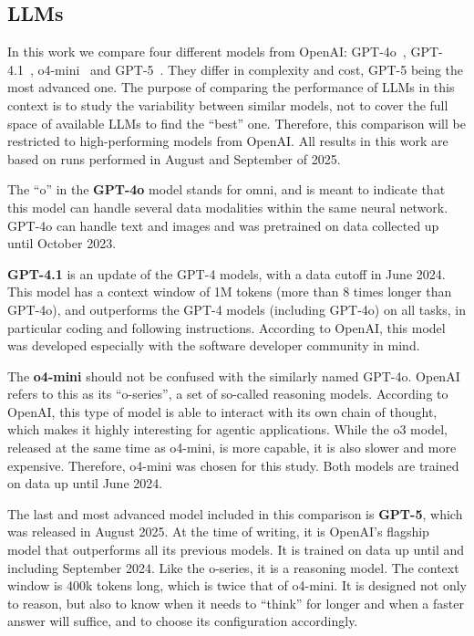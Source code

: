 \documentclass[submission, Phys]{SciPost}
\begin{document}
\subsection{LLMs}
\label{sec:llm_models}
In this work we compare four different models from OpenAI: GPT-4o~\cite{openaihelloGPT-4o,openai2024gpt4ocard}, GPT-4.1~\cite{openaiintroducingGPT-41}, o4-mini~\cite{openaiintroducingopenaio3ando4-mini,openaio3ando4-minicard} and GPT-5~\cite{openaiintroducinggpt-5,openaigpt-5systemcard}. They differ in complexity and cost, GPT-5 being the most advanced one. The purpose of comparing the performance of LLMs in this context is to study the variability between similar models, not to cover the full space of available LLMs to find the ``best'' one. Therefore, this comparison will be restricted to high-performing models from OpenAI. All results in this work are based on runs performed in August and September of 2025.

The ``o'' in the \textbf{GPT-4o} model stands for omni, and is meant to indicate that this model can handle several data modalities within the same neural network. GPT-4o can handle text and images and was pretrained on data collected up until October 2023. 

\textbf{GPT-4.1} is an update of the GPT-4 models, with a data cutoff in June 2024. This model has a context window of 1M tokens (more than 8 times longer than GPT-4o), and outperforms the GPT-4 models (including GPT-4o) on all tasks, in particular coding and following instructions. According to OpenAI, this model was developed especially with the software developer community in mind.

The \textbf{o4-mini} should not be confused with the similarly named GPT-4o. OpenAI refers to this as its ``o-series'', a set of so-called reasoning models. According to OpenAI, this type of model is able to interact with its own chain of thought, which makes it highly interesting for agentic applications. While the o3 model, released at the same time as o4-mini, is more capable, it is also slower and more expensive. Therefore, o4-mini was chosen for this study. Both models are trained on data up until June 2024.

The last and most advanced model included in this comparison is \textbf{GPT-5}, which was released in August 2025. At the time of writing, it is OpenAI's flagship model that outperforms all its previous models. It is trained on data up until and including September 2024. Like the o-series, it is a reasoning model. The context window is 400k tokens long, which is twice that of o4-mini. It is designed not only to reason, but also to know when it needs to ``think'' for longer and when a faster answer will suffice, and to choose its configuration accordingly. 
\end{document}

